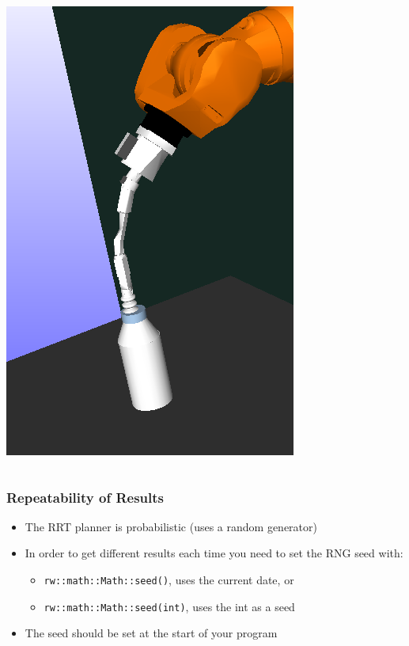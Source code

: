 \documentclass{beamer}
\begin{document}
\begin{frame}
\begin{columns}
\begin{column}{0.3\textwidth}
\begin{center}
        \includegraphics[width=\textwidth]{./mandEx2Grasp}
      \end{center}
    \end{column}
  \end{columns}
\end{frame}

\begin{frame}
  \frametitle{Repeatability of Results}
  \begin{itemize}
  \item The RRT planner is probabilistic (uses a random generator)
  \item In order to get different results each time you need to set the RNG seed with:
    \begin{itemize}
    \item \texttt{rw::math::Math::seed()}, uses the current date, or
    \item \texttt{rw::math::Math::seed(int)}, uses the int as a seed
    \end{itemize}
  \item The seed should be set at the start of your program
  \end{itemize}
\end{frame}
\end{document}
